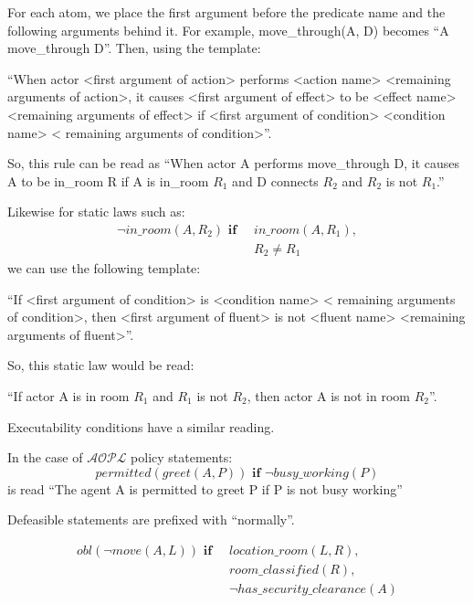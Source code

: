 For each atom, we place the first argument before the predicate name and the following arguments behind it.
For example, move\_through(A, D) becomes ``A move\_through D''.
Then, using the template:

``When actor <first argument of action> performs <action name> <remaining arguments of action>, it causes <first argument of effect> to be <effect name> <remaining arguments of effect> if <first argument of condition> <condition name> < remaining arguments of condition>''.

So, this rule can be read as ``When actor A performs move\_through D, it causes A to be in\_room R if A is in\_room $R_{1}$ and D connects $R_{2}$ and $R_{2}$ is not $R_{1}$.''

Likewise for static laws such as:
\begin{equation}
\begin{split}
    \neg in\_room(A, R_{2}) \textbf{ if } \
        & in\_room(A, R_{1}), \\
        & R_{2} \neq R_{1}
\end{split}
\end{equation}
we can use the following template:

``If <first argument of condition> is <condition name> < remaining arguments of condition>, then <first argument of fluent> is not <fluent name> <remaining arguments of fluent>''.

So, this static law would be read:

``If actor A is in room $R_{1}$ and $R_{1}$ is not $R_{2}$, then actor A is not in room $R_{2}$''.

Executability conditions have a similar reading.

In the case of $\mathcal{AOPL}$ policy statements:
\begin{equation}
    permitted(greet(A, P)) \textbf{ if }
        \neg busy\_working(P)
\end{equation}
is read ``The agent A is permitted to greet P if P is not busy working''

Defeasible statements are prefixed with ``normally''.

\begin{equation}
\begin{split}
    obl(\neg move(A, L)) \textbf{ if } \
        & location\_room(L, R), \\
        & room\_classified(R), \\
        & \neg has\_security\_clearance(A)
\end{split}
\end{equation}

